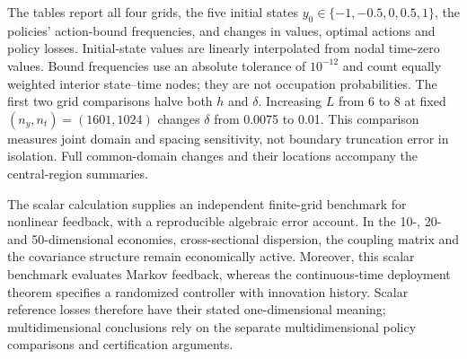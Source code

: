 The tables report all four grids, the five initial states
$y_0\in\{-1,-0.5,0,0.5,1\}$, the policies' action-bound frequencies, and
changes in values, optimal actions and policy losses. Initial-state values
are linearly interpolated from nodal time-zero values. Bound frequencies
use an absolute tolerance of $10^{-12}$ and count equally weighted interior
state--time nodes; they are not occupation probabilities. The first two grid
comparisons halve both $h$ and $\delta$. Increasing $L$ from 6 to 8 at fixed
$(n_y,n_t)=(1601,1024)$ changes $\delta$ from 0.0075 to 0.01. This comparison
measures joint domain and spacing sensitivity, not boundary truncation error
in isolation. Full common-domain changes and their locations accompany the
central-region summaries.

The scalar calculation supplies an independent finite-grid benchmark for
nonlinear feedback, with a reproducible algebraic error account. In the
10-, 20- and 50-dimensional economies, cross-sectional dispersion, the
coupling matrix and the covariance structure remain economically active.
Moreover, this scalar benchmark evaluates Markov feedback, whereas the
continuous-time deployment theorem specifies a randomized controller with
innovation history. Scalar reference losses therefore have their stated
one-dimensional meaning; multidimensional conclusions rely on the separate
multidimensional policy comparisons and certification arguments.
